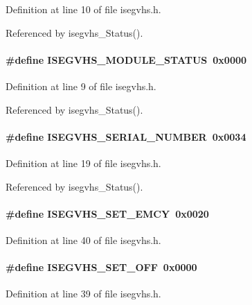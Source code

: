 Definition at line 10 of file isegvhs.h.

Referenced by isegvhs\_\-Status().
\paragraph[{ISEGVHS\_\-MODULE\_\-STATUS}]{\setlength{\rightskip}{0pt plus 5cm}\#define ISEGVHS\_\-MODULE\_\-STATUS~0x0000}\hfill\label{isegvhs_8h_a4702a1379ace7636383d68b541e59143}


Definition at line 9 of file isegvhs.h.

Referenced by isegvhs\_\-Status().
\paragraph[{ISEGVHS\_\-SERIAL\_\-NUMBER}]{\setlength{\rightskip}{0pt plus 5cm}\#define ISEGVHS\_\-SERIAL\_\-NUMBER~0x0034}\hfill\label{isegvhs_8h_af521bcd1fe4a607e376d6669960e41cf}


Definition at line 19 of file isegvhs.h.

Referenced by isegvhs\_\-Status().
\paragraph[{ISEGVHS\_\-SET\_\-EMCY}]{\setlength{\rightskip}{0pt plus 5cm}\#define ISEGVHS\_\-SET\_\-EMCY~0x0020}\hfill\label{isegvhs_8h_aa3487fd1f5027077c3083b981a2d91fe}


Definition at line 40 of file isegvhs.h.
\paragraph[{ISEGVHS\_\-SET\_\-OFF}]{\setlength{\rightskip}{0pt plus 5cm}\#define ISEGVHS\_\-SET\_\-OFF~0x0000}\hfill\label{isegvhs_8h_a7cb80da1448220bc5da7e8af2f1e60b2}


Definition at line 39 of file isegvhs.h.
